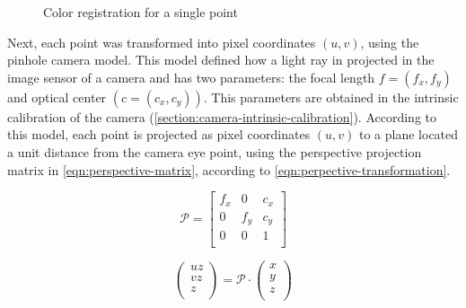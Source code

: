 \begin{figure}

    \caption{Color registration for a single point}
    \label{fig:color-registration-3d}
\end{figure}

Next, each point was transformed into pixel coordinates $(u, v)$, using the pinhole camera model. This model defined how a light ray in projected in the image sensor of a camera and has two parameters: the focal length $f = (f_x, f_y)$ and optical center $(c = (c_x, c_y))$. This parameters are obtained in the intrinsic calibration of the camera (\cref{section:camera-intrinsic-calibration}). According to this model, each point is projected as pixel coordinates $(u, v)$ to a plane located a unit distance from the camera eye point, using the perspective projection matrix in \cref{eqn:perspective-matrix}, according to \cref{eqn:perpective-transformation}. 

\begin{equation}
    \label{eqn:perspective-matrix}
    \mathcal{P} =
    \left[
        \begin{array}{ccc}
            f_x & 0   & c_x \\
            0   & f_y & c_y \\
            0   & 0   & 1   \\
        \end{array}    
    \right]
\end{equation}

\begin{equation}
    \label{eqn:perpective-transformation}
    \left(
        \begin{array}{c}
            u z \\ v z \\ z \\
        \end{array}    
    \right)
    =
    \mathcal{P} \cdot
    \left(
        \begin{array}{c}
            x \\ y \\ z \\
        \end{array}    
    \right)
\end{equation}

